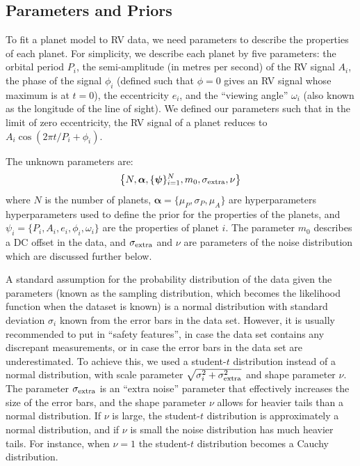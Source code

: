 \documentclass[useAMS,usenatbib]{mn2e}
\begin{document}
\subsection{Parameters and Priors}
To fit a planet model to RV data, we need parameters to describe
the properties of each planet. For simplicity, we describe each planet by
five parameters: the orbital period $P_i$, the semi-amplitude (in metres
per second) of the RV signal $A_i$, the phase of the signal
$\phi_i$ (defined such that $\phi=0$ gives an RV signal whose maximum is at
$t=0$), the eccentricity $e_i$, and the ``viewing angle'' $\omega_i$
(also known as the longitude of the line of sight). We defined our parameters
such that in the limit of zero eccentricity, the RV signal of a planet
reduces to $A_i\cos\left(2\pi t/P_i + \phi_i\right)$.

The unknown parameters are:
\begin{eqnarray}
\left\{N, \boldsymbol{\alpha}, \{\boldsymbol{\psi}\}_{i=1}^N, m_0,
\sigma_{\rm extra}, \nu\right\}
\end{eqnarray}
where $N$ is the number of planets,
$\boldsymbol{\alpha} = \{\mu_P, \sigma_P, \mu_A\}$ are hyperparameters
hyperparameters used to define the prior for the properties of the planets,
and $\psi_i = \{P_i, A_i, e_i, \phi_i, \omega_i\}$
are the properties of planet $i$.
The parameter $m_0$ describes a DC offset in the data, and
$\sigma_{\rm extra}$ and $\nu$ are parameters of the noise distribution
which are discussed further below.

A standard assumption for the probability distribution of the data given the
parameters (known as the sampling distribution, which becomes the likelihood
function when the dataset is known) is a normal distribution with
standard deviation $\sigma_i$ known from the error bars in the data set.
However, it is usually recommended to put in ``safety features'', in case the
data set contains any discrepant measurements, or in case the error bars in the
data set are underestimated. To achieve this, we used a student-$t$ distribution
instead of a normal distribution, with
scale parameter $\sqrt{\sigma_i^2 + \sigma_{\rm extra}^2}$ and shape parameter $\nu$. The
parameter $\sigma_{\rm extra}$ is an ``extra noise'' parameter that effectively increases the
size of the error bars, and the shape parameter $\nu$ allows for heavier tails
than a normal distribution. If $\nu$ is large, the student-$t$ distribution
is approximately a normal distribution, and if $\nu$ is small the noise
distribution has much heavier tails. For instance, when $\nu=1$ the student-$t$
distribution becomes a Cauchy distribution.
\end{document}
